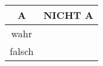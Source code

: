 \documentclass[ngerman, 11pt]{scrreprt}
\begin{document}
\begin{aufgabe*}
\begin{enumerate}[label=\alph*), itemsep=0ex, parsep=0ex]
			\medskip
			\begin{minipage}{0.4\textwidth}
				
			\end{minipage}
			\hfill
			\begin{minipage}{0.4\textwidth}
				\centering
				\begin{tabular}{c | c}
					\textbf{A}  & \textbf{NICHT A} \\ \hline
					wahr &  \\
					falsch &  \\  
				\end{tabular}
			\end{minipage}
			\hfill
		\end{enumerate}
	\end{aufgabe*}
	
	
	
	\newpage
	\setcounter{chapter}{3}
	\setcounter{section}{3}
\end{document}

